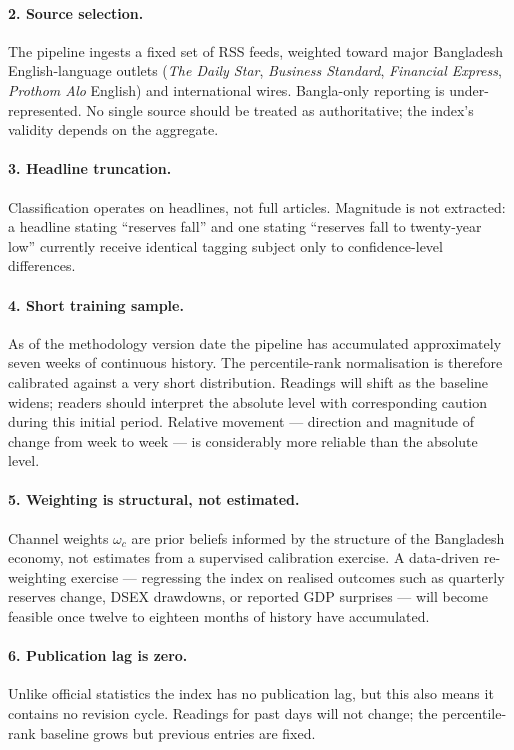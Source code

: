 \documentclass[11pt, a4paper]{article}
\begin{document}
\paragraph{2. Source selection.} The pipeline ingests a fixed set of
RSS feeds, weighted toward major Bangladesh English-language outlets
(\textit{The Daily Star}, \textit{Business Standard},
\textit{Financial Express}, \textit{Prothom Alo} English) and
international wires. Bangla-only reporting is under-represented. No
single source should be treated as authoritative; the index's validity
depends on the aggregate.

\paragraph{3. Headline truncation.} Classification operates on
headlines, not full articles. Magnitude is not extracted: a headline
stating ``reserves fall'' and one stating ``reserves fall to
twenty-year low'' currently receive identical tagging subject only to
confidence-level differences.

\paragraph{4. Short training sample.} As of the methodology version date
the pipeline has accumulated approximately seven weeks of continuous
history. The percentile-rank normalisation is therefore calibrated
against a very short distribution. Readings will shift as the baseline
widens; readers should interpret the absolute level with
corresponding caution during this initial period. Relative movement ---
direction and magnitude of change from week to week --- is considerably
more reliable than the absolute level.

\paragraph{5. Weighting is structural, not estimated.} Channel weights
$\omega_c$ are prior beliefs informed by the structure of the
Bangladesh economy, not estimates from a supervised calibration
exercise. A data-driven re-weighting exercise --- regressing the
index on realised outcomes such as quarterly reserves change,
DSEX drawdowns, or reported GDP surprises --- will become feasible
once twelve to eighteen months of history have accumulated.

\paragraph{6. Publication lag is zero.} Unlike official statistics the
index has no publication lag, but this also means it contains no
revision cycle. Readings for past days will not change; the
percentile-rank baseline grows but previous entries are fixed.
\end{document}
